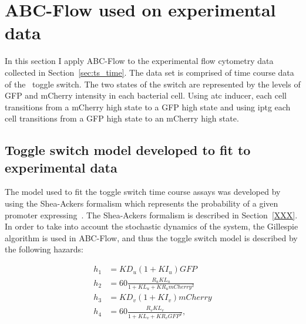 %

\section{ABC-Flow used on experimental data}
 
In this section I apply ABC-Flow to the experimental flow cytometry data collected in Section~\ref{sec:ts_time}. The data set is comprised of time course data of the~\textcite{Litcofsky:2012gr} toggle switch. The two states of the switch are represented by the levels of GFP and mCherry intensity in each bacterial cell. Using \acrshort{atc} inducer, each cell transitions from a mCherry high state to a GFP high state and using \acrshort{iptg} each cell transitions from a GFP high state to an mCherry high state. 


\subsection{Toggle switch model developed to fit to experimental data}
\label{sec:Real_model}
The model used to fit the toggle switch time course assays was developed by using the Shea-Ackers formalism which represents the probability of a given promoter expressing~\autocite{Ackers:1982tq}. The Shea-Ackers formalism is described in Section~\ref{XXX}. In order to take into account the stochastic dynamics of the system, the Gillespie algorithm is used in ABC-Flow, and thus the toggle switch model is described by the following hazards:

\begin{align}
h_1 &= KD_u  (1 + KI_u)  GFP\\
h_2 &= 60  \frac{R_u KL_u}{1 + KL_u + KR_u  mCherry^2}\\
h_3 &= KD_v  (1 + KI_v)  mCherry\\
h_4 &= 60  \frac{R_v  KL_v}{1+ KL_v + KR_v  GFP^2},
\end{align}    
    
